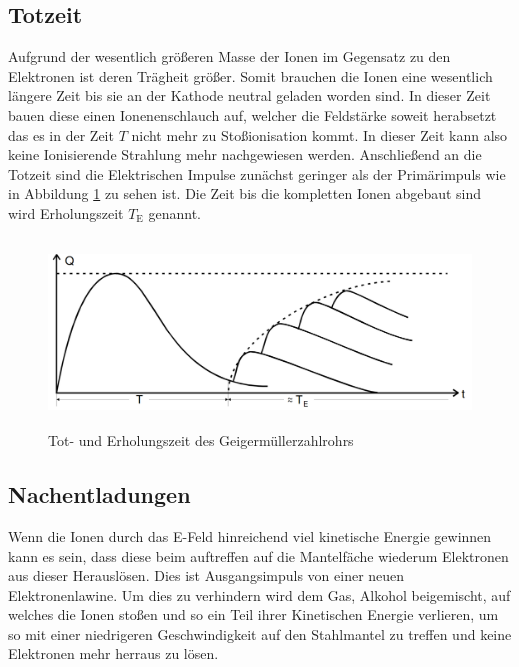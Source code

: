 \subsection{Totzeit}
Aufgrund der wesentlich größeren Masse der Ionen im Gegensatz zu den Elektronen ist deren Trägheit größer. Somit brauchen die Ionen eine wesentlich längere Zeit bis sie an der Kathode neutral geladen worden sind. In dieser Zeit bauen diese einen Ionenenschlauch auf, welcher die Feldstärke soweit herabsetzt das es in der Zeit $T$ nicht mehr zu Stoßionisation kommt. In dieser Zeit kann also keine Ionisierende Strahlung mehr nachgewiesen werden. Anschließend an die Totzeit sind die Elektrischen Impulse zunächst geringer als der Primärimpuls wie in Abbildung \ref{fig:tot} zu sehen ist. Die Zeit bis die kompletten Ionen abgebaut sind wird Erholungszeit $T_\text{E}$ genannt.
\begin{figure}
  \centering
  \includegraphics[height=5cm]{picture/Nachentladung.pdf}
  \caption{Tot- und Erholungszeit des Geigermüllerzahlrohrs \cite{sample}}
  \label{fig:tot}
\end{figure}


\subsection{Nachentladungen}
Wenn die Ionen durch das E-Feld hinreichend viel kinetische Energie gewinnen kann es sein, dass diese beim auftreffen auf die Mantelfäche wiederum Elektronen aus dieser Herauslösen. Dies ist Ausgangsimpuls von einer neuen Elektronenlawine. Um dies zu verhindern wird dem Gas, Alkohol beigemischt, auf welches die Ionen stoßen und so ein Teil ihrer Kinetischen Energie verlieren, um so mit einer niedrigeren Geschwindigkeit auf den Stahlmantel zu treffen und keine Elektronen mehr herraus zu lösen.


